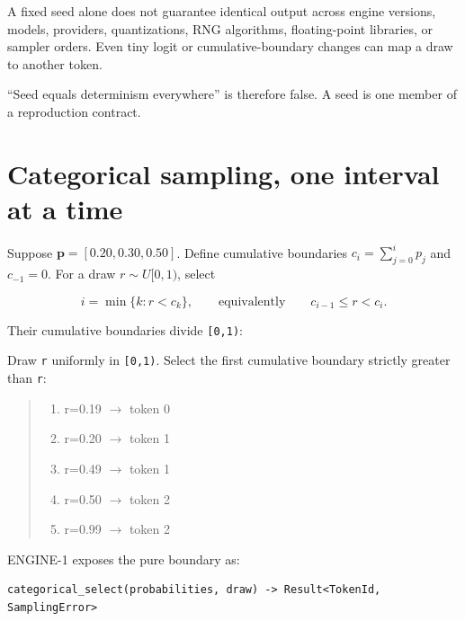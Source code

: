 A fixed seed alone does not guarantee identical output across engine
versions, models, providers, quantizations, RNG algorithms,
floating-point libraries, or sampler orders. Even tiny logit or
cumulative-boundary changes can map a draw to another token.

``Seed equals determinism everywhere'' is therefore false. A seed is one
member of a reproduction contract.

\section{Categorical sampling, one interval at a
time}\label{categorical-sampling-one-interval-at-a-time}

Suppose \(\mathbf{p}=[0.20,0.30,0.50]\). Define cumulative boundaries
\(c_i=\sum_{j=0}^{i}p_j\) and \(c_{-1}=0\). For a draw \(r\sim U[0,1)\),
select

\begin{equation}
i=\min\{k:r<c_k\},
\qquad\text{equivalently}\qquad c_{i-1}\le r<c_i.
\end{equation}

Their cumulative boundaries divide \texttt{{[}0,1)}:


Draw \texttt{r} uniformly in \texttt{{[}0,1)}. Select the first
cumulative boundary strictly greater than \texttt{r}:

\begin{quote}
\begin{enumerate}
\item r=0.19  \(\longrightarrow\)  token 0
\item r=0.20  \(\longrightarrow\)  token 1
\item r=0.49  \(\longrightarrow\)  token 1
\item r=0.50  \(\longrightarrow\)  token 2
\item r=0.99  \(\longrightarrow\)  token 2
\end{enumerate}
\end{quote}

ENGINE-1 exposes the pure boundary as:

\begin{verbatim}
categorical_select(probabilities, draw) -> Result<TokenId, SamplingError>
\end{verbatim}

